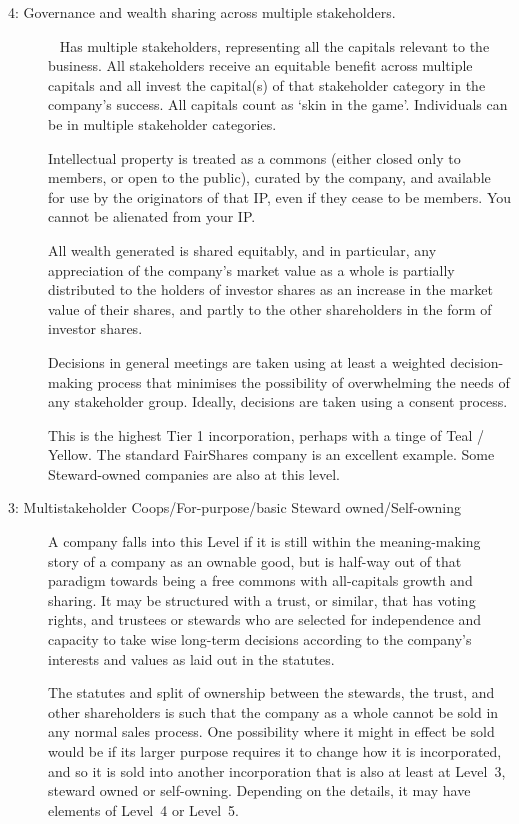 \begin{description}
\item[4: Governance and wealth sharing across multiple stakeholders.] ~\newline
Has multiple stakeholders, representing all the capitals relevant to the business. All stakeholders receive an equitable benefit across multiple capitals and all invest the capital(s) of that stakeholder category in the company’s success. All capitals count as ‘skin in the game’\cite{taleb-skin}. Individuals can be in multiple stakeholder categories.


Intellectual property is treated as a commons (either closed only to members, or open to the public), curated by the company, and available for use by the originators of that IP, even if they cease to be members. You cannot be alienated from your IP.


All wealth generated is shared equitably, and in particular, any appreciation of the company’s market value as a whole is partially distributed to the holders of investor shares as an increase in the market value of their shares, and partly to the other shareholders in the form of investor shares.


Decisions in general meetings are taken using at least a weighted decision-making process that minimises the possibility of overwhelming the needs of any stakeholder group. Ideally, decisions are taken using a consent process. 


This is the highest Tier 1 incorporation, perhaps with a tinge of Teal / Yellow. The standard FairShares company is an excellent example. Some Steward-owned companies are also at this level\cite{purpose-foundation}.


\item[3: Multistakeholder Coops/For-purpose/basic Steward owned/Self-owning] %
A company falls into this Level if it is still within the meaning\hyp{}making story of a company as an ownable good, but is half-way out of that paradigm towards being a free commons with all-capitals growth and sharing. It may be structured with a trust, or similar, that has voting rights, and trustees or stewards who are selected for independence and capacity to take wise long-term decisions according to the company’s interests and values as laid out in the statutes.


The statutes and split of ownership between the stewards, the trust, and other shareholders is such that the company as a whole cannot be sold in any normal sales process. One possibility where it might in effect be sold would be if its larger purpose requires it to change how it is incorporated, and so it is sold into another incorporation that is also at least at Level~3, steward owned or self-owning. Depending on the details\cite{purpose-foundation}, it may have elements of Level~4 or Level~5.



\end{description}
